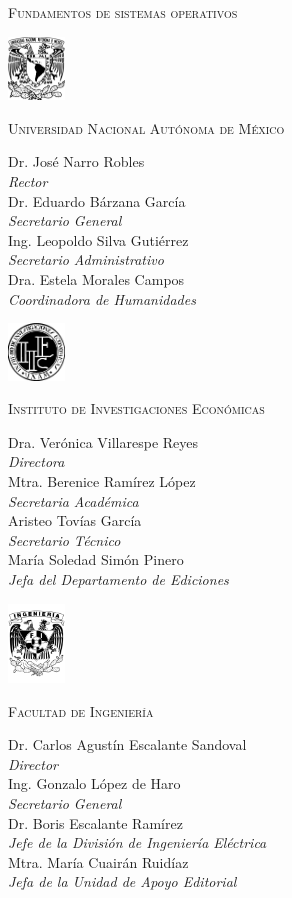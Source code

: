 \pagestyle{empty}
\renewcommand{\thepage}{\arabic{page}}

\textsc{Fundamentos de sistemas operativos}
\eject

\begin{center}
  \includegraphics[width=1.5cm]{unam/logo_unam}

  \textsc{Universidad Nacional Autónoma de México}

  Dr. José Narro Robles\\\textit{Rector}\\
  Dr. Eduardo Bárzana García\\\textit{Secretario General}\\
  Ing. Leopoldo Silva Gutiérrez\\\textit{Secretario Administrativo}\\
  Dra. Estela Morales Campos\\\textit{Coordinadora de Humanidades}

  \vfill
  \includegraphics[width=1.5cm]{unam/logo_iiec}

  \textsc{Instituto de Investigaciones Económicas}

  Dra. Verónica Villarespe Reyes\\\textit{Directora}\\
  Mtra. Berenice Ramírez López\\\textit{Secretaria Académica}\\
  Aristeo Tovías García\\\textit{Secretario Técnico}\\
  María Soledad Simón Pinero\\\textit{Jefa del Departamento de Ediciones}

  \vfill
  \includegraphics[width=1.5cm]{unam/logo_fi}

  \textsc{Facultad de Ingeniería}

  Dr. Carlos Agustín Escalante Sandoval\\\textit{Director}\\
  Ing. Gonzalo López de Haro\\\textit{Secretario General}\\
  Dr. Boris Escalante Ramírez\\\textit{Jefe de la División de
    Ingeniería Eléctrica}\\
  Mtra. María Cuairán Ruidíaz\\\textit{Jefa de la Unidad de Apoyo Editorial}

\end{center}


